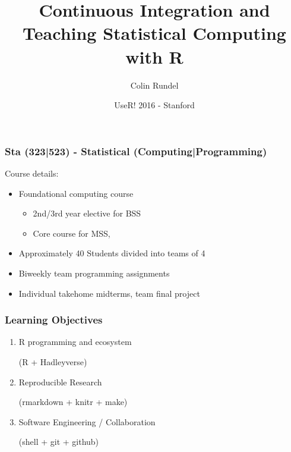 \documentclass[12pt]{beamer}
\title{Continuous Integration and Teaching Statistical Computing with R}
\subtitle{}
\date{UseR! 2016 - Stanford}
\author{Colin Rundel}
\institute{Duke University\\Department of Statistical Science}
\begin{document}
\maketitle


\begin{frame}
\frametitle{Sta (323|523) - Statistical (Computing|Programming)}

Course details:
\begin{itemize}
\item Foundational computing course
\begin{itemize}
\item 2nd/3rd year elective for BSS
\item Core course for MSS, 
\end{itemize}
\vspace{2mm}
\item Approximately 40 Students divided into teams of 4
\vspace{2mm}
\item Biweekly team programming assignments
\vspace{2mm}
\item Individual takehome midterms, team final project
\end{itemize}

\end{frame}


\begin{frame}
\frametitle{Learning Objectives}

{\large
\begin{enumerate}
 
\item R programming and ecosystem \\
      \begin{center} {\small (R + Hadleyverse)} \end{center}

\vspace{5mm}

\item Reproducible Research \\
      \begin{center} {\small (rmarkdown + knitr + make)} \end{center}

\vspace{5mm}

\item Software Engineering / Collaboration \\
      \begin{center} {\small (shell + git + github)} \end{center}

\end{enumerate}
}
\end{frame}
\end{document}
